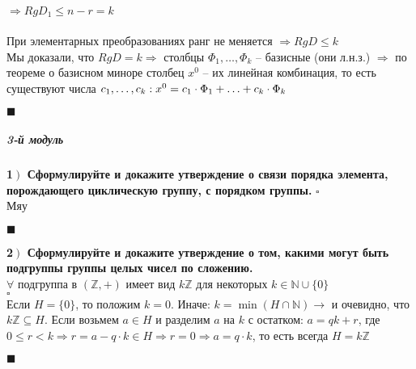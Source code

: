 \documentclass[a4paper,12pt]{article}
\begin{document}
    $\Rightarrow RgD_1\leq n-r=k$\\
    \\
    При элементарных преобразованиях ранг не меняется $\Rightarrow RgD\leq k$\\
    Мы доказали, что $RgD=k\Rightarrow$ столбцы $\Phi_1, \ldots, \Phi_k$ -- базисные (они л.н.з.) $\Rightarrow$ по теореме о базисном миноре столбец $x^0$ -- их линейная комбинация, то есть существуют числа $c_1, \ldots, c_k :\\ x^0=c_1\cdot\Phi_1+\ldots+c_k\cdot\Phi_k$
    \begin{flushright}
        $\blacksquare$
    \end{flushright}


    \subparagraph{3-й модуль}
    \textbf{1$\left.\right)$ Сформулируйте и докажите утверждение о связи порядка элемента, порождающего циклическую группу, с порядком группы.}
    $\square$\\
    Мяу
    \begin{flushright}
        $\blacksquare$
    \end{flushright}

    \textbf{2$\left.\right)$ Сформулируйте и докажите утверждение о том, какими могут быть подгруппы группы целых чисел по сложению.}\\$\forall$ подгруппа в $(\mathbb{Z}, +)$ имеет вид $k\mathbb{Z}$ для некоторых $k\in \mathbb{N}\cup\{0\}$\\
    $\square$\\
    Если $H=\{0\}$, то положим $k=0$. Иначе: $k=\min(H\cap\mathbb{N})\rightarrow$ и очевидно, что $k\mathbb{Z}\subseteq H$. Если возьмем $a\in H$ и разделим $a$ на $k$ с остатком: $a=qk+r$, где $0\leq r<k\Rightarrow r=a-q\cdot k\in H\Rightarrow r=0\Rightarrow a=q\cdot k$, то есть всегда $H=k\mathbb{Z}$
    \begin{flushright}
        $\blacksquare$
    \end{flushright}
\end{document}
